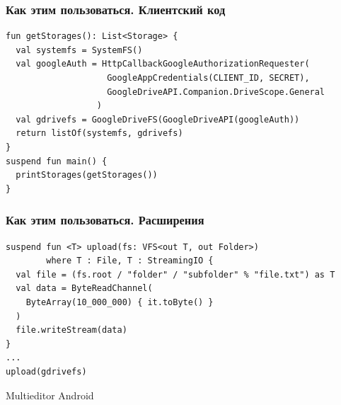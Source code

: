 \documentclass[14pt,aspectratio=169,hyperref={pdftex,unicode},xcolor=dvipsnames]{beamer}
\begin{document}
\begin{frame}[fragile]
\frametitle{Как этим пользоваться. Клиентский код}
\begin{verbatim}
fun getStorages(): List<Storage> {
  val systemfs = SystemFS()
  val googleAuth = HttpCallbackGoogleAuthorizationRequester(
                    GoogleAppCredentials(CLIENT_ID, SECRET), 
                    GoogleDriveAPI.Companion.DriveScope.General
                  )
  val gdrivefs = GoogleDriveFS(GoogleDriveAPI(googleAuth))
  return listOf(systemfs, gdrivefs)
}
suspend fun main() {
  printStorages(getStorages())
}
\end{verbatim}
\end{frame}

\begin{frame}[fragile]
\frametitle{Как этим пользоваться. Расширения}
\begin{verbatim}
suspend fun <T> upload(fs: VFS<out T, out Folder>)
        where T : File, T : StreamingIO {
  val file = (fs.root / "folder" / "subfolder" % "file.txt") as T
  val data = ByteReadChannel(
    ByteArray(10_000_000) { it.toByte() }
  )
  file.writeStream(data)
}
...
upload(gdrivefs)
\end{verbatim}
\end{frame}
  
\begin{frame}{Multieditor Android}
  \begin{center}
  \end{center}
\end{frame}
\end{document}
